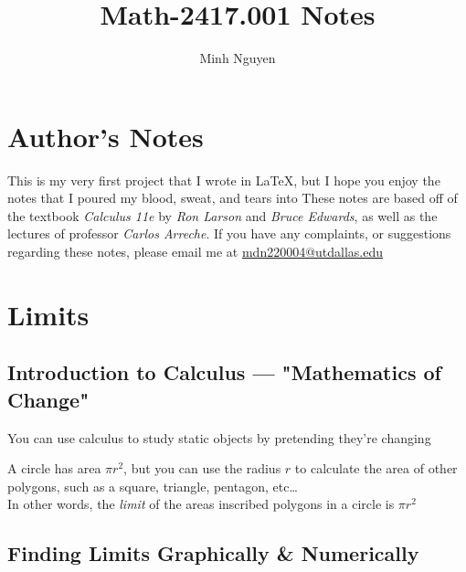 \documentclass{MathNotes}
\title{Math-2417.001 Notes}
\author{Minh Nguyen}
\begin{document}
\newpage
\maketitle
{}
\tableofcontents
\newpage
\section*{Author's Notes}
This is my very first project that I wrote in \LaTeX, but I hope you enjoy
the notes that I poured my blood, sweat, and tears into  
\br
These notes are based off of the textbook \textit{Calculus 11e} by 
\textit{Ron Larson} and \textit{Bruce Edwards}, as well as the lectures of 
professor \textit{Carlos Arreche}.
\br
If you have any complaints, or suggestions regarding these notes, please
email me at \href{mailto:minh.nguyen7@utdallas.edu}{mdn220004@utdallas.edu}
\newpage
{}

\section{Limits}\label{sec:1}
\subsection{Introduction to Calculus --- "Mathematics of Change"}

You can use calculus to study static objects by pretending they're changing
\\

\begin{example}{}
    A circle has area $\pi r^2$, but you can use the radius $r$ to calculate
    the area of other polygons, such as a square, triangle, pentagon, etc\dots
    \\

    In other words, the \textit{limit} of the areas inscribed polygons in a circle
    is $\pi r^2$
\end{example}

\subsection{Finding Limits Graphically \& Numerically}
\end{document}

